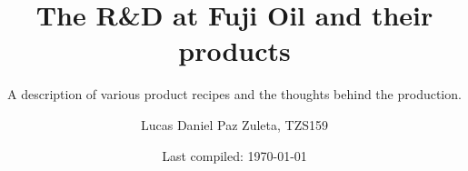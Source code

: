 \title{The R\&D at Fuji Oil and their products}
\subtitle{A description of various product recipes and the thoughts behind the production.}
\author{Lucas Daniel Paz Zuleta, TZS159}
\date{Last compiled: \today}


\begingroup
  \selectfont %
  \maketitle
\endgroup